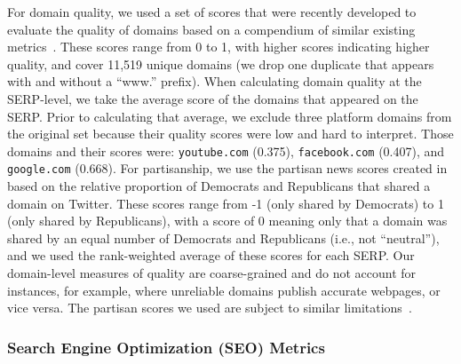 For domain quality, we used a set of scores that were recently developed to evaluate the quality of domains based on a compendium of similar existing metrics~\citep{lin2023high}.
These scores range from 0 to 1, with higher scores indicating higher quality, and cover 11,519 unique domains (we drop one duplicate that appears with and without a ``www.'' prefix).
When calculating domain quality at the SERP-level, we take the average score of the domains that appeared on the SERP.
Prior to calculating that average, we exclude three platform domains from the original set because their quality scores were low and hard to interpret.
Those domains and their scores were: \nolinkurl{youtube.com} (0.375), \nolinkurl{facebook.com} (0.407), and \nolinkurl{google.com} (0.668). 
For partisanship, we use the partisan news scores created in~\citep{robertson2018auditing} based on the relative proportion of Democrats and Republicans that shared a domain on Twitter.
These scores range from -1 (only shared by Democrats) to 1 (only shared by Republicans), with a score of 0 meaning only that a domain was shared by an equal number of Democrats and Republicans (i.e., not ``neutral''), and we used the rank-weighted average of these scores for each SERP.
Our domain-level measures of quality are coarse-grained and do not account for instances, for example, where unreliable domains publish accurate webpages, or vice versa.
The partisan scores we used are subject to similar limitations~\citep{green2025curation}.

\subsubsection{Search Engine Optimization (SEO) Metrics}
\label{sec:methods-domains-seo}

